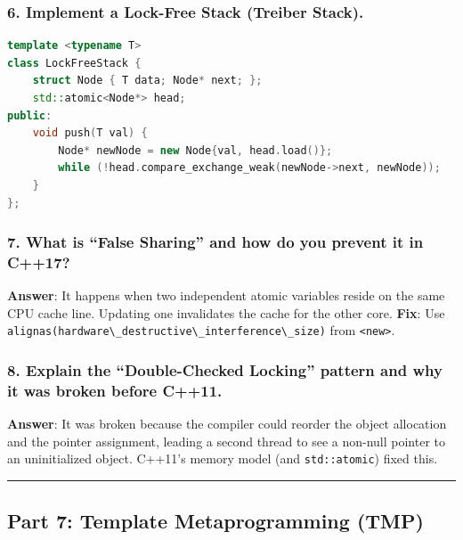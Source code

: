 \hypertarget{implement-a-lock-free-stack-treiber-stack.}{%
\subsubsection{6. Implement a Lock-Free Stack (Treiber
Stack).}\label{implement-a-lock-free-stack-treiber-stack.}}

\begin{lstlisting}[language={C++}]
template <typename T>
class LockFreeStack {
    struct Node { T data; Node* next; };
    std::atomic<Node*> head;
public:
    void push(T val) {
        Node* newNode = new Node{val, head.load()};
        while (!head.compare_exchange_weak(newNode->next, newNode));
    }
};
\end{lstlisting}

\hypertarget{what-is-false-sharing-and-how-do-you-prevent-it-in-c17}{%
\subsubsection{7. What is ``False Sharing'' and how do you prevent it in
C++17?}\label{what-is-false-sharing-and-how-do-you-prevent-it-in-c17}}

\textbf{Answer}: It happens when two independent atomic variables reside
on the same CPU cache line. Updating one invalidates the cache for the
other core. \textbf{Fix}: Use
\passthrough{\lstinline!alignas(hardware\_destructive\_interference\_size)!}
from \passthrough{\lstinline!<new>!}.

\hypertarget{explain-the-double-checked-locking-pattern-and-why-it-was-broken-before-c11.}{%
\subsubsection{8. Explain the ``Double-Checked Locking'' pattern and why
it was broken before
C++11.}\label{explain-the-double-checked-locking-pattern-and-why-it-was-broken-before-c11.}}

\textbf{Answer}: It was broken because the compiler could reorder the
object allocation and the pointer assignment, leading a second thread to
see a non-null pointer to an uninitialized object. C++11's memory model
(and \passthrough{\lstinline!std::atomic!}) fixed this.

\begin{center}\rule{0.5\linewidth}{0.5pt}\end{center}

\hypertarget{part-7-template-metaprogramming-tmp}{%
\subsection{Part 7: Template Metaprogramming
(TMP)}\label{part-7-template-metaprogramming-tmp}}

